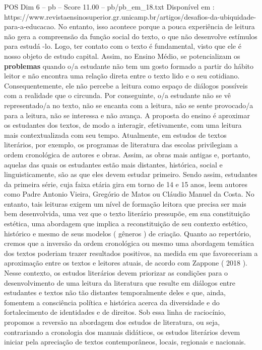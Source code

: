 \begin{textsample}{POS Dim 6 – pb – Score 11.00 – pb/pb\_em\_18.txt}
Disponível em : https://www.revistaensinosuperior.gr.unicamp.br/artigos/desafios-da-ubiquidade-para-a-educacao.
No entanto, isso acontece porque a pouca experiência de leitura não gera a compreensão da função social do texto, o que não desenvolve estímulos para estudá -lo.
Logo, ter contato com o texto é fundamental, visto que ele é nosso objeto de estudo capital.
Assim, no Ensino Médio, se potencializam os \textbf{problemas} quando o/a estudante não tem um gosto formado a partir do hábito leitor e não encontra uma relação direta entre o texto lido e o seu cotidiano.
Consequentemente, ele não percebe a leitura como espaço de diálogos possíveis com a realidade que o circunda.
Por conseguinte, o/a estudante não se vê representado/a no texto, não se encanta com a leitura, não se sente provocado/a para a leitura, não se interessa e não avança.
A proposta do ensino é aproximar os estudantes dos textos, de modo a interagir, efetivamente, com uma leitura mais contextualizada com seu tempo.
Atualmente, em estudos de textos literários, por exemplo, os programas de literatura das escolas privilegiam a ordem cronológica de autores e obras.
Assim, as obras mais antigas e, portanto, aquelas das quais os estudantes estão mais distantes, histórica, social e linguisticamente, são as que eles devem estudar primeiro.
Sendo assim, estudantes da primeira série, cuja faixa etária gira em torno de 14 e 15 anos, leem autores como Padre Antonio Vieira, Gregório de Matos ou Cláudio Manuel da Costa.
No entanto, tais leituras exigem um nível de formação leitora que precisa ser mais bem desenvolvida, uma vez que o texto literário pressupõe, em sua constituição estética, uma abordagem que implica a reconstituição de seu contexto estético, histórico e mesmo de seus modelos ( gêneros ) de criação.
Quanto ao repertório, cremos que a inversão da ordem cronológica ou mesmo uma abordagem temática dos textos poderiam trazer resultados positivos, na medida em que favoreceriam a aproximação entre os textos e leitores atuais, de acordo com Zappone ( 2018 ).
Nesse contexto, os estudos literários devem priorizar as condições para o desenvolvimento de uma leitura da literatura que resulte em diálogos entre estudantes e textos não tão distantes temporalmente deles e que, ainda, fomentem a consciência política e histórica acerca da diversidade e do fortalecimento de identidades e de direitos.
Sob essa linha de raciocínio, propomos a reversão na abordagem dos estudos de literatura, ou seja, contrariando a cronologia dos manuais didáticos, os estudos literários devem iniciar pela apreciação de textos contemporâneos, locais, regionais e nacionais.

\end{textsample}

